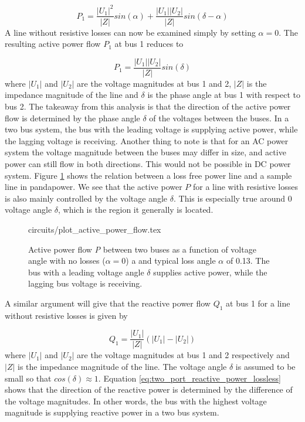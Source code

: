\documentclass[class=book, crop=false]{standalone}
\begin{document}
\begin{equation}\label{eq:two_port_active_power_good}
P_{1} = \frac{|U_{1}|^2}{|Z|}sin(\alpha) + \frac{|U_{1}||U_{2}|}{|Z|}sin(\delta -\alpha)
\end{equation}
A line without resistive losses can now be examined simply by setting $\alpha = 0$. The resulting active power flow $P_{1}$ at bus 1 reduces to

\begin{equation}\label{eq:two_port_active_power_lossless}
P_{1} =  \frac{|U_{1}||U_{2}|}{|Z|}sin(\delta)
\end{equation}
where $|U_{1}|$ and $|U_{2}|$ are the voltage magnitudes at bus 1 and 2, $|Z|$ is the impedance magnitude of the line and $\delta$ is the phase angle at bus 1 with respect to bus 2. The takeaway from this analysis is that the direction of the active power flow is determined by the phase angle $\delta$ of the voltages between the buses. In a two bus system, the bus with the leading voltage is supplying active power, while the lagging voltage is receiving. Another thing to note is that for an AC power system the voltage magnitude between the buses may differ in size, and active power can still flow in both directions. This would not be possible in DC power system. Figure \ref{fig:theory:active_power_flow} shows the relation between a loss free power line and a sample line in pandapower. We see that the active power $P$ for a line with resistive losses is also mainly controlled by the voltage angle $\delta$. This is especially true around 0 voltage angle $\delta$, which is the region it generally is located. 


\begin{figure}[ht!]
    \center
    {circuits/plot_active_power_flow.tex}
    \caption[size = 9]{Active power flow \textit{P} between two buses as a function of voltage angle with no losses ($\alpha=0$) a and typical loss angle $\alpha$ of 0.13. The bus with a leading voltage angle $\delta$ supplies active power, while the lagging bus voltage is receiving.} \label{fig:theory:active_power_flow}
\end{figure}

A similar argument will give that the reactive power flow $Q_{1}$ at bus 1 for a line without resistive losses is given by 

\begin{equation}\label{eq:two_port_reactive_power_lossless}
Q_{1} =  \frac{|U_{1}|}{|Z|}(|U_{1}| - |U_{2}|)
\end{equation}
where $|U_{1}|$ and $|U_{2}|$ are the voltage magnitudes at bus 1 and 2 respectively and $|Z|$ is the impedance magnitude of the line. The voltage angle $\delta$ is assumed to be small so that $cos(\delta) \approx 1$. Equation \eqref{eq:two_port_reactive_power_lossless} shows that the direction of the reactive power is determined by the difference of the voltage magnitudes. In other words, the bus with the highest voltage magnitude is supplying reactive power in a two bus system.
\end{document}
